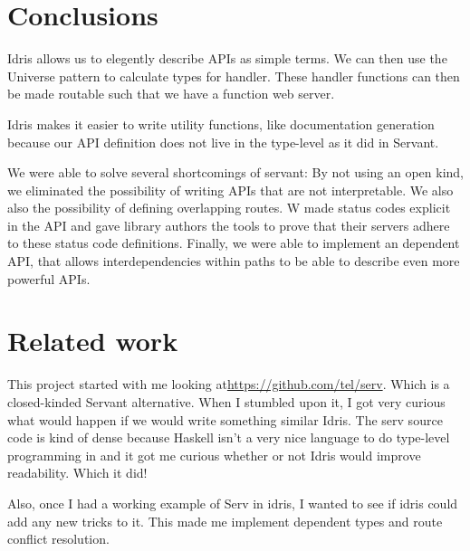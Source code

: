\documentclass[12pt,a4paper]{article}
\begin{document}
\section{Conclusions}
Idris allows us to elegently describe APIs as simple terms. We can
then use the Universe pattern to calculate types for handler.
These handler functions can then be made routable such that we have
a function web server.

Idris makes it easier to write utility functions, like documentation generation
because our API definition does not live in the type-level as it did in Servant.

We were able to solve several shortcomings of servant: By not using an open kind, 
we eliminated the possibility of writing APIs that are not interpretable.  We also also the possibility
of defining overlapping routes. W made status codes explicit in the API and gave
library authors the tools to prove that their servers adhere to these status code
definitions.  Finally, we were able to implement an dependent API, that allows interdependencies
within paths to be able to describe even more powerful APIs.


\section{Related work}
This project started with me looking at\url{https://github.com/tel/serv}. Which is
a closed-kinded Servant alternative. When I stumbled upon it, I got very curious
what would happen if we would write something similar Idris.  The serv source code is kind of
dense because Haskell isn't a very nice language to do type-level programming in
and it got me curious whether or not Idris would improve readability. Which it did!

Also, once I had a working example of Serv in idris, I wanted to see if idris
could add any new tricks to it. This made me implement dependent types and
route conflict resolution.


\end{document}
